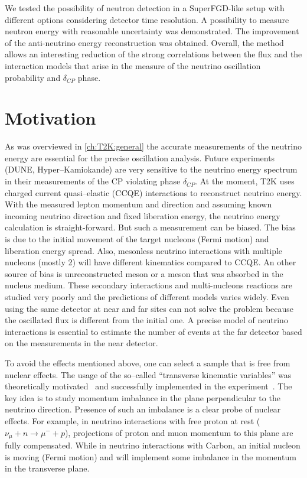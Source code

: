 \documentclass[main.tex]{subfiles}
\begin{document}
We tested the possibility of neutron detection in a SuperFGD-like setup with different options considering detector time resolution. A possibility to measure neutron energy with reasonable uncertainty was demonstrated. The improvement of the anti-neutrino energy reconstruction was obtained. Overall, the method allows an interesting reduction of the strong correlations between the flux and the interaction models that arise in the measure of the neutrino oscillation probability and $\delta_{CP}$ phase.

\section{Motivation}
As was overviewed in \autoref{ch:T2K:general} the accurate measurements of the neutrino energy are essential for the precise oscillation analysis. Future experiments (DUNE, Hyper--Kamiokande) are very sensitive to the neutrino energy spectrum in their measurements of the CP violating phase $\delta_{CP}$. At the moment, T2K uses charged current quasi--elastic (CCQE) interactions to reconstruct neutrino energy. With the measured lepton momentum and direction and assuming known incoming neutrino direction and fixed liberation energy, the neutrino energy calculation is straight-forward. But such a measurement can be biased. The bias is due to the initial movement of the target nucleons (Fermi motion) and liberation energy spread. Also, mesonless neutrino interactions with multiple nucleons (mostly 2) will have different kinematics compared to CCQE. An other source of bias is unreconstructed meson or a meson that was absorbed in the nucleus medium. These secondary interactions and multi-nucleons reactions are studied very poorly and the predictions of different models varies widely. Even using the same detector at near and far sites can not solve the problem because the oscillated flux is different from the initial one. A precise model of neutrino interactions is essential to estimate the number of events at the far detector based on the measurements in the near detector.

To avoid the effects mentioned above, one can select a sample that is free from nuclear effects. The usage of the so--called ``transverse kinematic variables'' was theoretically motivated~\cite{Lu2016} and successfully implemented in the experiment~\cite{Abe2018d}. The key idea is to study momentum imbalance in the plane perpendicular to the neutrino direction. Presence of such an imbalance is a clear probe of nuclear effects. For example, in neutrino interactions with free proton at rest ($\nu_\mu+n\to\mu^-+p$), projections of proton and muon momentum to this plane are fully compensated. While in neutrino interactions with Carbon, an initial nucleon is moving (Fermi motion) and will implement some imbalance in the momentum in the transverse plane.
\end{document}
